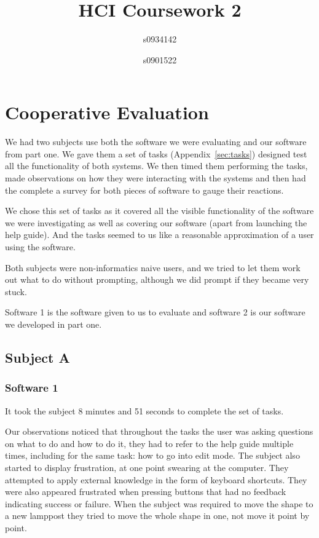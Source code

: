 \documentclass[a4paper,11pt,oneside]{article}
\begin{document}
\title{HCI Coursework 2}
\author{s0934142 \and s0901522}
\maketitle

\tableofcontents

\newpage

\section{Cooperative Evaluation}
We had two subjects use both the software we were evaluating and our software from part one.  We gave them a set of tasks (Appendix~\ref{sec:tasks}) designed test all the functionality of both systems.  We then timed them performing the tasks, made observations on how they were interacting with the systems and then had the complete a survey for both pieces of software to gauge their reactions.

We chose this set of tasks as it covered all the visible functionality of the software we were investigating as well as covering our software (apart from launching the help guide).  And the tasks seemed to us like a reasonable approximation of a user using the software.

Both subjects were non-informatics naive users, and we tried to let them work out what to do without prompting, although we did prompt if they became very stuck.

Software 1 is the software given to us to evaluate and software 2 is our software we developed in part one.

\subsection{Subject A}

\subsubsection{Software 1}
It took the subject 8 minutes and 51 seconds to complete the set of tasks. 

Our observations noticed that throughout the tasks the user was asking questions on what to do and how to do it, they had to refer to the help guide multiple times, including for the same task: how to go into edit mode.  The subject also started to display frustration, at one point swearing at the computer.  They attempted to apply external knowledge in the form of keyboard shortcuts.  They were also appeared frustrated when pressing buttons that had no feedback indicating success or failure.  When the subject was required to move the shape to a new lamppost they tried to move the whole shape in one, not move it point by point.
\end{document}
